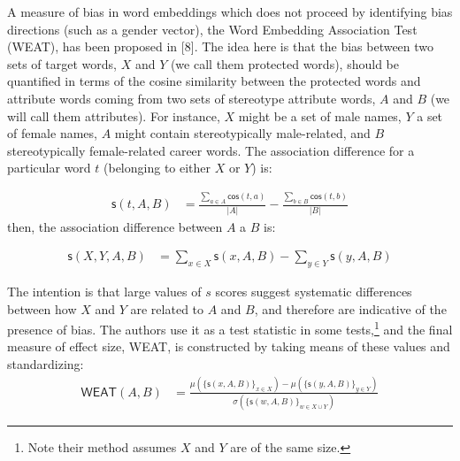 \documentclass[
  12pt,
  dvipsnames,enabledeprecatedfontcommands]{scrartcl}
\begin{document}
A measure of bias in word embeddings which does not proceed by
identifying bias directions (such as a gender vector), the Word
Embedding Association Test (\textsf{WEAT}), has been proposed in
{[}8{]}. The idea here is that the bias between two sets of target
words, \(X\) and \(Y\) (we call them protected words), should be
quantified in terms of the cosine similarity between the protected words
and attribute words coming from two sets of stereotype attribute words,
\(A\) and \(B\) (we will call them attributes). For instance, \(X\)
might be a set of male names, \(Y\) a set of female names, \(A\) might
contain stereotypically male-related, and \(B\) stereotypically
female-related career words. The association difference for a particular
word \(t\) (belonging to either \(X\) or \(Y\)) is:

\vspace{-2mm}

\begin{align}
\label{eq:stAB}
\mathsf{s}(t,A,B) & = \frac{\sum_{a\in A}\mathsf{cos}(t,a)}{\vert A\vert} - \frac{\sum_{b\in B}\mathsf{cos}(t,b)}{\vert B\vert}
\end{align} \normalsize \noindent then, the association difference
between \(A\) a \(B\) is:

\begin{align}
\label{eq:sXYAB}
\mathsf{s}(X,Y,A,B) & = \sum_{x\in X} \mathsf{s}(x,A,B) -  \sum_{y\in Y} \mathsf{s}(y,A,B)
\end{align}

\noindent The intention is that large values of \(s\) scores suggest
systematic differences between how \(X\) and \(Y\) are related to \(A\)
and \(B\), and therefore are indicative of the presence of bias. The
authors use it as a test statistic in some tests,\footnote{Note their
  method assumes \(X\) and \(Y\) are of the same size.} and the final
measure of effect size, \textsf{WEAT}, is constructed by taking means of
these values and standardizing: \begin{align} \label{eq:weat}
\mathsf{WEAT}(A,B) & = \frac{
\mu(\{\mathsf{s}(x,A,B)\}_{x\in X}) -\mu(\{\mathsf{s}(y,A,B)\}_{y\in Y}) 
}{
\sigma(\{\mathsf{s}(w,A,B)\}_{w\in X\cup Y})
}
\end{align}
\end{document}
